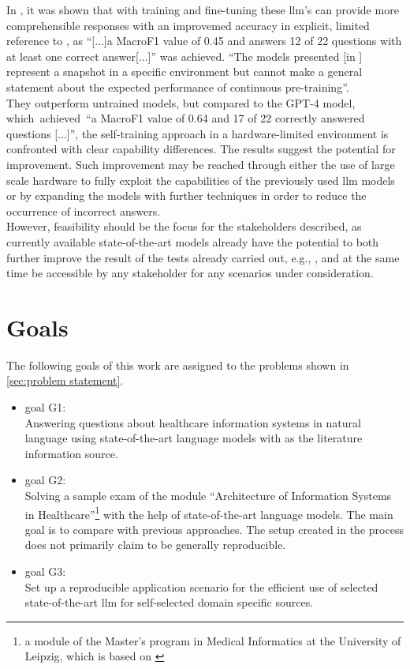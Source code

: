 In \citet{Paul_Keller}, it was shown that with training and fine-tuning these \ac{llm}'s can provide more comprehensible responses with an improvemed accuracy in explicit, limited reference to \citet{bb2}, as \enquote{[$\dots$]a MacroF1 value of \num{0.45} and answers \num{12} of \num{22} questions with at least one correct answer[$\dots$]} was achieved.
\enquote{The models presented [in \citet{Paul_Keller}] represent a snapshot in a specific environment but cannot make a general statement about the expected performance of continuous pre-training}\citep{Paul_Keller}.\\
They outperform untrained models, but compared to the GPT-4 model, which~achieved~\enquote{a MacroF1 value of \num{0.64} and \num{17} of \num{22} correctly answered questions [$\dots$]}\citep{Paul_Keller}, the self-training approach in a hardware-limited environment is confronted with clear capability differences.
%
The results suggest the potential for improvement. 
Such improvement may be reached through either the use of large scale hardware to fully exploit the capabilities of the previously used \ac{llm} models or by expanding the models with further techniques in order to reduce the occurrence of incorrect answers. \\
%
However, feasibility should be the focus for the stakeholders described, as currently available state-of-the-art models already have the potential to both further improve the result of the tests already carried out, e.g., \citet{Paul_Keller}, and at the same time be accessible by any stakeholder for any scenarios under consideration.

\section{Goals}\label{sec:goals}
The following goals of this work are assigned to the problems shown in \cref{sec:problem statement}.
\begin{itemize}
  \item goal G1:\\
    Answering questions about healthcare information systems in natural language using state-of-the-art language models with \citet{bb2} as the literature information source. 
  \item goal G2:\\
   Solving a sample exam of the module \enquote{Architecture of Information Systems in Healthcare}\footnote{\raggedright{}a module of the Master's program in Medical Informatics at the University of Leipzig, which is based on \citet{bb2}} with the help of state-of-the-art language models.\@
   The main goal is to compare with previous approaches.
   The setup created in the process does not primarily claim to be generally reproducible.
   \item goal G3:\\
   Set up a reproducible application scenario for the efficient use of selected state-of-the-art \ac{llm} for self-selected domain specific sources.
\end{itemize}
